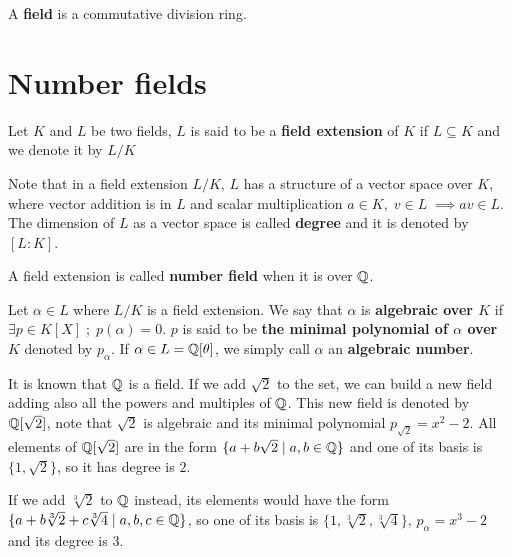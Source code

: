 \documentclass[Ingles]{ic-tese-v3}
\begin{document}
\begin{definition}
  A \textbf{field} is a commutative division ring.
\end{definition}

\section{Number  fields}
\label{sec:org14d98e3}

   \begin{definition}
  Let $K$ and $L$ be two fields, $L$ is said to be a \textbf{field extension} of
  $K$ if $L \subseteq K$ and we denote it by $L/K$
\end{definition}

Note that in a field extension \(L/K\), \(L\) has a structure of a vector space over
\(K\), where vector addition is in \(L\) and scalar multiplication \(a \in K, \; v \in L
   \; \implies av \in L\). The dimension of \(L\) as a vector space is called
\textbf{degree} and it is denoted by \([L:K]\).

\begin{definition}
  A field extension is called \textbf{number field} when it is over $\mathbb{Q}$.
\end{definition}

\begin{definition}
  Let $\alpha \in L$ where $L/K$ is a field extension. We say that $\alpha$ is
  \textbf{algebraic over $K$} if $\exists p \in K[X] \;;\; p(\alpha) = 0$. $p$ is said to be
  \textbf{the minimal polynomial of $\alpha$ over $K$} denoted by $p_\alpha$. If $\alpha \in L =
  \mathbb{Q}[\theta]$, we simply call $\alpha$ an \textbf{algebraic number}.
\end{definition}

\begin{example}
  It is known that $\mathbb{Q}$ is a field. If we add $\sqrt{2}$ to the set, we
  can build a new field adding also all the powers and multiples of
  $\mathbb{Q}$. This new field is denoted by $\mathbb{Q}[\sqrt{2}]$, note that
  $\sqrt{2}$ is algebraic and its minimal polynomial $p_{\sqrt{2}} = x^2-2$. All
  elements of $\mathbb{Q}[\sqrt{2}]$ are in the form $\{a+b\sqrt{2} \;|\; a,b \in
  \mathbb{Q}\}$ and one of its basis is $\{1, \sqrt{2}\}$, so it has degree is
  $2$.
\end{example}

\begin{example}
  If we add $\sqrt[3]{2}$ to $\mathbb{Q}$ instead, its elements would have the
  form $\{a + b\sqrt[3]{2} + c\sqrt[3]{4} \;|\; a,b,c \in \mathbb{Q}\}$, so one of
  its basis is $\{1 ,\sqrt[3]{2} ,\sqrt[3]{4}\}$, $p_\alpha = x^3 - 2$ and its degree
  is $3$.
\end{example}
\end{document}
